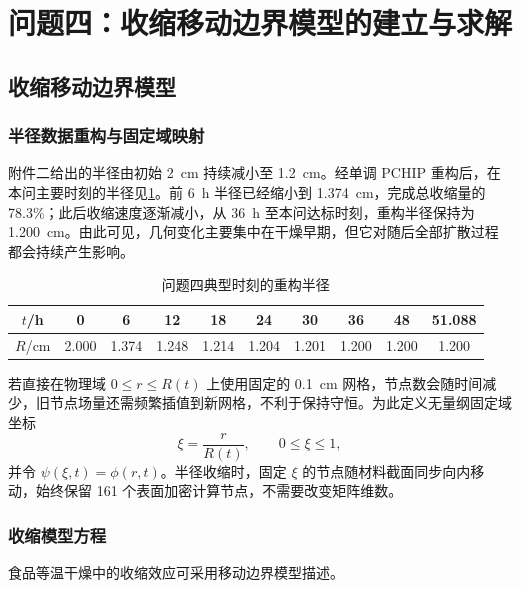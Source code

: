 \section{问题四：收缩移动边界模型的建立与求解}

\subsection{收缩移动边界模型}

\subsubsection{半径数据重构与固定域映射}

附件二给出的半径由初始 2~cm 持续减小至 1.2~cm。经单调 PCHIP 重构后，在本问主要时刻的半径见\cref{tab:q4radius}。前 6~h 半径已经缩小到 1.374~cm，完成总收缩量的 78.3\%；此后收缩速度逐渐减小，从 36~h 至本问达标时刻，重构半径保持为 1.200~cm。由此可见，几何变化主要集中在干燥早期，但它对随后全部扩散过程都会持续产生影响。

\begin{table}[!htbp]
\centering
\caption{问题四典型时刻的重构半径}\label{tab:q4radius}
\begin{tabular}{cccccccccc}
\toprule
$t$/h&0&6&12&18&24&30&36&48&51.088\\
\midrule
$R$/cm&2.000&1.374&1.248&1.214&1.204&1.201&1.200&1.200&1.200\\
\bottomrule
\end{tabular}
\end{table}

若直接在物理域 $0\le r\le R(t)$ 上使用固定的 0.1~cm 网格，节点数会随时间减少，旧节点场量还需频繁插值到新网格，不利于保持守恒。为此定义无量纲固定域坐标
\begin{equation}
\xi=\frac{r}{R(t)},\qquad 0\le\xi\le1,
\label{eq:xi}
\end{equation}
并令 $\psi(\xi,t)=\phi(r,t)$。半径收缩时，固定 $\xi$ 的节点随材料截面同步向内移动，始终保留 161 个表面加密计算节点，不需要改变矩阵维数。

\subsubsection{收缩模型方程}

食品等温干燥中的收缩效应可采用移动边界模型描述\cite{shrinkage2019}。

